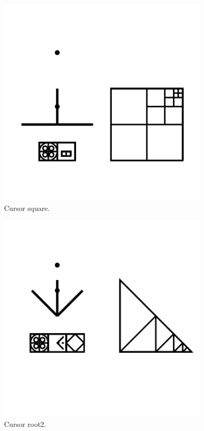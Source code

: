 \begin{figure}
	\centering
	\includegraphics[width=4in]{figures/web2d/cursorsquare.png}
	\caption[cursorsquare]
	{Cursor square.}
\end{figure}
\begin{figure}
	\centering
	\includegraphics[width=4in]{figures/web2d/cursorroot2.png}
	\caption[cursorroot2]
	{Cursor root2.}
\end{figure}
